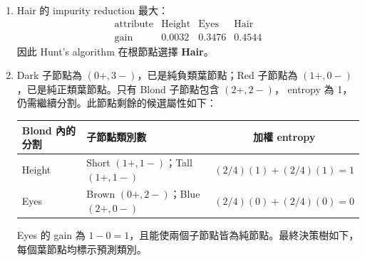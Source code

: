 \begin{enumerate}
  \item Hair 的 impurity reduction 最大：
  \[
  \begin{array}{c|ccc}
    \text{attribute} & \text{Height} & \text{Eyes} & \text{Hair}\\ \hline
    \text{gain} & 0.0032 & 0.3476 & \mathbf{0.4544}
  \end{array}
  \]
  因此 Hunt's algorithm 在根節點選擇 \textbf{Hair}。

  \item Dark 子節點為 $(0+,3-)$，已是純負類葉節點；Red 子節點為
  $(1+,0-)$，已是純正類葉節點。只有 Blond 子節點包含 $(2+,2-)$，
  entropy 為 1，仍需繼續分割。此節點剩餘的候選屬性如下：

  \begin{center}
  \begin{tabularx}{0.94\linewidth}{lXc}
    \toprule
    Blond 內的分割 & 子節點類別數 & 加權 entropy \\
    \midrule
    Height & Short $(1+,1-)$；Tall $(1+,1-)$
           & $(2/4)(1)+(2/4)(1)=1$ \\
    Eyes & Brown $(0+,2-)$；Blue $(2+,0-)$
         & $(2/4)(0)+(2/4)(0)=0$ \\
    \bottomrule
  \end{tabularx}
  \end{center}

  Eyes 的 gain 為 $1-0=1$，且能使兩個子節點皆為純節點。最終決策樹如下，
  每個葉節點均標示預測類別。

  \begin{center}
  \end{center}


\end{enumerate}
